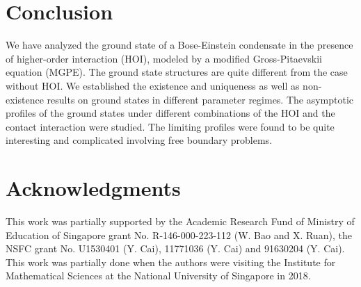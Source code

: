 \documentclass{elsarticle}
\newcommand{\be}{\begin{equation}}
\newcommand{\ee}{\end{equation}}
\newcommand{\bx}{{\bf x} }
\begin{document}
%
%
%


\section{Conclusion}
We  have analyzed the ground state of a Bose-Einstein condensate in the presence of higher-order interaction (HOI),
modeled by a modified Gross-Pitaevskii equation (MGPE).
The ground state structures are quite different from the case without HOI.
We established the existence and  uniqueness as well as non-existence
results on ground states in different parameter regimes. The asymptotic profiles of the ground states
under different combinations of the HOI and the contact interaction were studied. The limiting profiles were found to
be quite interesting and complicated involving free boundary problems. %


\section*{Acknowledgments}
This work was partially supported by the Academic Research
Fund of Ministry of Education of Singapore grant No.
R-146-000-223-112 (W. Bao and X. Ruan), the NSFC grant No. U1530401 (Y. Cai), 11771036 (Y. Cai)  and  91630204 (Y. Cai). This work was partially done
when the authors were visiting the Institute for Mathematical Sciences
at the National University of Singapore in 2018.
\end{document}
